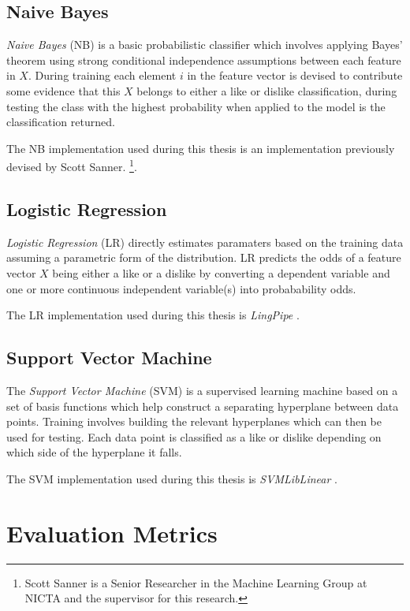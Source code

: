 \subsection{Naive Bayes}
\label{sec:nb}

\emph{Naive Bayes} (NB) is a basic probabilistic classifier which involves applying Bayes' theorem using strong conditional independence 
assumptions between each feature in $X$. During training each element $i$ in the feature vector is devised to contribute some 
evidence that this $X$ belongs to either a like or dislike classification, during testing the class with the highest probability 
when applied to the model is the classification returned. 

The NB implementation used during this thesis is an implementation previously devised by Scott Sanner.
\footnote{Scott Sanner is a Senior Researcher in the Machine Learning Group at NICTA and the supervisor for this research.}.

\subsection{Logistic Regression}
\label{sec:lr}

\emph{Logistic Regression} (LR) directly estimates paramaters based on the training data assuming a parametric form of the distribution.
LR predicts the odds of a feature vector $X$ being either a like or a dislike by converting a dependent variable and 
one or more continuous independent variable(s) into probabability odds.

The LR implementation used during this thesis is \emph{LingPipe} \cite{lin}.

\subsection{Support Vector Machine}
\label{sec:svm}

The \emph{Support Vector Machine} (SVM) is a supervised learning machine based on a set of basis functions which help construct 
a separating hyperplane between data points. Training involves building the relevant hyperplanes which can then be used for testing. 
Each data point is classified as a like or dislike depending on which side of the hyperplane it falls.

The SVM implementation used during this thesis is \emph{SVMLibLinear} \cite{cjlin}.

\section{Evaluation Metrics}
\label{sec:notation}

